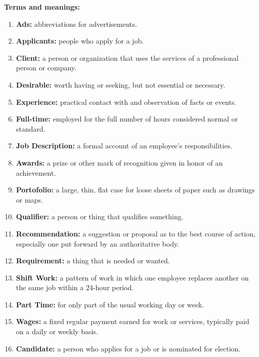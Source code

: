 \documentclass[12pt,titlepage]{article}
\begin{document}
\textbf{Terms and meanings:}
\begin{enumerate}
    \item {
        \textbf{Ads:} abbreviations for advertisements.
    }
    \item {
        \textbf{Applicants:} people who apply for a job.
    }
    \item {
        \textbf{Client:} a person or organization that uses the services of a professional person or company.
    }
    \item {
        \textbf{Desirable:} worth having or seeking, but not essential or necessary.
    }
    \item {
        \textbf{Experience:} practical contact with and observation of facts or events.
    }
    \item {
        \textbf{Full-time:} employed for the full number of hours considered normal or standard.
    }
    \item {
        \textbf{Job Description:} a formal account of an employee's responsibilities.
    }
    \item {
        \textbf{Awards:} a prize or other mark of recognition given in honor of an achievement.
    }
    \item {
        \textbf{Portofolio:} a large, thin, flat case for loose sheets of paper such as drawings or maps.
    }
    \item {
        \textbf{Qualifier:} a person or thing that qualifies something.
    }
    \item {
        \textbf{Recommendation:} a suggestion or proposal as to the best course of action, especially one put forward by an authoritative body.
    }
    \item {
        \textbf{Requirement:} a thing that is needed or wanted.
    }
    \item {
        \textbf{Shift Work:} a pattern of work in which one employee replaces another on the same job within a 24-hour period.
    }
    \item {
        \textbf{Part Time:} for only part of the usual working day or week.
    }
    \item {
        \textbf{Wages:} a fixed regular payment earned for work or services, typically paid on a daily or weekly basis.
    }
    \item {
        \textbf{Candidate:} a person who applies for a job or is nominated for election.
    }
\end{enumerate}

\pagebreak
\end{document}
